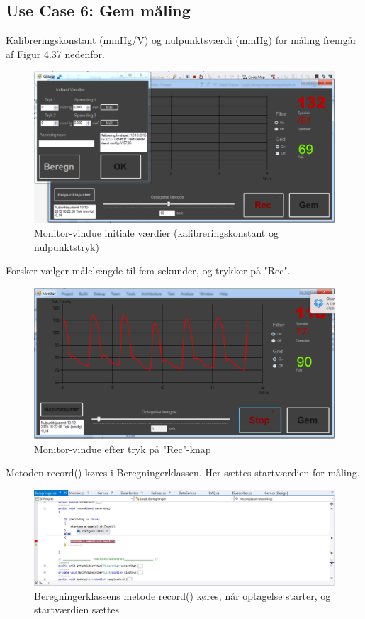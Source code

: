 \subsection{Use Case 6: Gem måling}
Kalibreringskonstant (mmHg/V) og nulpunktsværdi (mmHg) for måling fremgår af Figur 4.37 nedenfor.
\begin{figure}[H]
	\centering
	\includegraphics[width=1\textwidth]{Figurer/UC6_InitialConditions}
	\caption{Monitor-vindue initiale værdier (kalibreringskonstant og nulpunktstryk)}
\end{figure}
 
 Forsker vælger målelængde til fem sekunder, og trykker på "Rec".
 
\begin{figure}[H]
	\centering
	\includegraphics[width=1\textwidth]{Figurer/UC6_ForceRecEnd}
	\caption{Monitor-vindue efter tryk på "Rec"\--knap}
\end{figure}

Metoden record() køres i Beregningerklassen. Her sættes startværdien for måling.

\begin{figure}[H]
	\centering
	\includegraphics[width=1\textwidth]{Figurer/UC6_Record_Start}
	\caption{Beregningerklassens metode record() køres, når optagelse starter, og startværdien sættes}
\end{figure}

